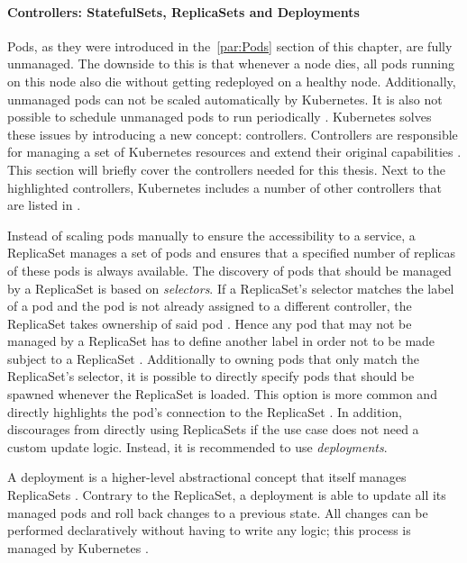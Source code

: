 \paragraph{Controllers: StatefulSets, ReplicaSets and Deployments}%
\label{par:Controllers}
Pods, as they were introduced in the~\ref{par:Pods} section of this chapter,
are fully unmanaged. The downside to this is that whenever a node dies, all
pods running on this node also die without getting redeployed on a healthy
node. Additionally, unmanaged pods can not be scaled automatically by
Kubernetes. It is also not possible to schedule unmanaged pods to run
periodically \autocite[Ch. 4]{LuksaKubernetesAction2017}. Kubernetes solves
these issues by introducing a new concept: controllers. Controllers are
responsible for managing a set of Kubernetes resources and extend their
original capabilities \autocite{AuthorsConcepts2019}. This section will briefly
cover the controllers needed for this thesis. Next to the highlighted
controllers, Kubernetes includes a number of other controllers that are listed
in \autocite{AuthorsConcepts2019}.

Instead of scaling pods manually to ensure the accessibility to a service, a
ReplicaSet manages a set of pods and ensures that a specified number of
replicas of these pods is always available. The discovery of pods that should
be managed by a ReplicaSet is based on \textit{selectors}. If a ReplicaSet's
selector matches the label of a pod and the pod is not already assigned to a
different controller, the ReplicaSet takes ownership of said pod \autocite[Ch.
4]{LuksaKubernetesAction2017}. Hence any pod that may not be managed by a
ReplicaSet has to define another label in order not to be made subject to a
ReplicaSet \autocite{AuthorsReplicaSet2019}. Additionally to owning pods that
only match the ReplicaSet's selector, it is possible to directly specify pods
that should be spawned whenever the ReplicaSet is loaded. This option is more
common and directly highlights the pod's connection to the ReplicaSet
\autocite{AuthorsReplicaSet2019}. In addition, \autocite{AuthorsReplicaSet2019}
discourages from directly using ReplicaSets if the use case does not need a
custom update logic. Instead, it is recommended to use \textit{deployments}.

A deployment is a higher-level abstractional concept that itself manages
ReplicaSets \autocite{AuthorsReplicaSet2019}. Contrary to the ReplicaSet, a
deployment is able to update all its managed pods and roll back changes to a
previous state. All changes can be performed declaratively without having to
write any logic; this process is managed by Kubernetes \autocite[Ch.
9]{LuksaKubernetesAction2017}.

